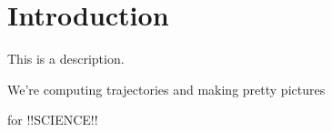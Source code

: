 \setcounter{chapter}{0}

\chapter{Introduction}

This is a description.

We're computing trajectories and making pretty pictures

for !!SCIENCE!!